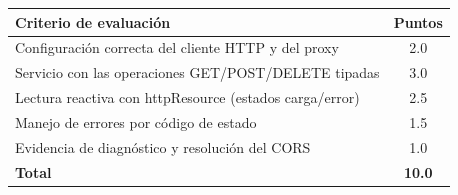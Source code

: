 \documentclass[11pt,a4paper]{article}
\newcommand{\code}[1]{{\ttfamily\color{ngdark}#1}}
\begin{document}
\begin{center}
\begin{tabular}{@{}p{6.5cm}c@{}}
	\toprule
	\textbf{Criterio de evaluación} & \textbf{Puntos} \\
	\midrule
	Configuración correcta del cliente HTTP y del proxy & 2.0 \\
	Servicio con las operaciones GET/POST/DELETE tipadas & 3.0 \\
	Lectura reactiva con \code{httpResource} (estados carga/error) & 2.5 \\
	Manejo de errores por código de estado & 1.5 \\
	Evidencia de diagnóstico y resolución del CORS & 1.0 \\
	\midrule
	\textbf{Total} & \textbf{10.0} \\
	\bottomrule
\end{tabular}
\end{center}

\printbibliography[title={Referencias}]
\end{document}
